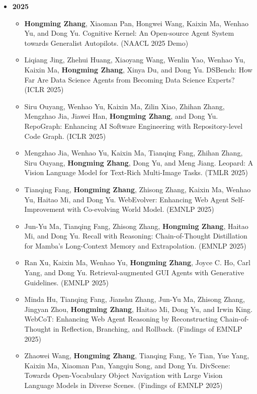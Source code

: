 \begin{itemize}[leftmargin=*, itemsep=0.35em, topsep=0.2em]
  \item[] \textbf{2025}
  \begin{itemize}[leftmargin=1.5em, itemsep=0.2em, topsep=0.1em]
    \item \textbf{Hongming Zhang}, Xiaoman Pan, Hongwei Wang, Kaixin Ma, Wenhao Yu, and Dong Yu. Cognitive Kernel: An Open-source Agent System towards Generalist Autopilots. (NAACL 2025 Demo)
    \item Liqiang Jing, Zhehui Huang, Xiaoyang Wang, Wenlin Yao, Wenhao Yu, Kaixin Ma, \textbf{Hongming Zhang}, Xinya Du, and Dong Yu. DSBench: How Far Are Data Science Agents from Becoming Data Science Experts? (ICLR 2025)
    \item Siru Ouyang, Wenhao Yu, Kaixin Ma, Zilin Xiao, Zhihan Zhang, Mengzhao Jia, Jiawei Han, \textbf{Hongming Zhang}, and Dong Yu. RepoGraph: Enhancing AI Software Engineering with Repository-level Code Graph. (ICLR 2025)
    \item Mengzhao Jia, Wenhao Yu, Kaixin Ma, Tianqing Fang, Zhihan Zhang, Siru Ouyang, \textbf{Hongming Zhang}, Dong Yu, and Meng Jiang. Leopard: A Vision Language Model for Text-Rich Multi-Image Tasks. (TMLR 2025)
    \item Tianqing Fang, \textbf{Hongming Zhang}, Zhisong Zhang, Kaixin Ma, Wenhao Yu, Haitao Mi, and Dong Yu. WebEvolver: Enhancing Web Agent Self-Improvement with Co-evolving World Model. (EMNLP 2025)
    \item Jun-Yu Ma, Tianqing Fang, Zhisong Zhang, \textbf{Hongming Zhang}, Haitao Mi, and Dong Yu. Recall with Reasoning: Chain-of-Thought Distillation for Mamba's Long-Context Memory and Extrapolation. (EMNLP 2025)
    \item Ran Xu, Kaixin Ma, Wenhao Yu, \textbf{Hongming Zhang}, Joyce C. Ho, Carl Yang, and Dong Yu. Retrieval-augmented GUI Agents with Generative Guidelines. (EMNLP 2025)
    \item Minda Hu, Tianqing Fang, Jianshu Zhang, Jun-Yu Ma, Zhisong Zhang, Jingyan Zhou, \textbf{Hongming Zhang}, Haitao Mi, Dong Yu, and Irwin King. WebCoT: Enhancing Web Agent Reasoning by Reconstructing Chain-of-Thought in Reflection, Branching, and Rollback. (Findings of EMNLP 2025)
    \item Zhaowei Wang, \textbf{Hongming Zhang}, Tianqing Fang, Ye Tian, Yue Yang, Kaixin Ma, Xiaoman Pan, Yangqiu Song, and Dong Yu. DivScene: Towards Open-Vocabulary Object Navigation with Large Vision Language Models in Diverse Scenes. (Findings of EMNLP 2025)
  \end{itemize}


\end{itemize}
